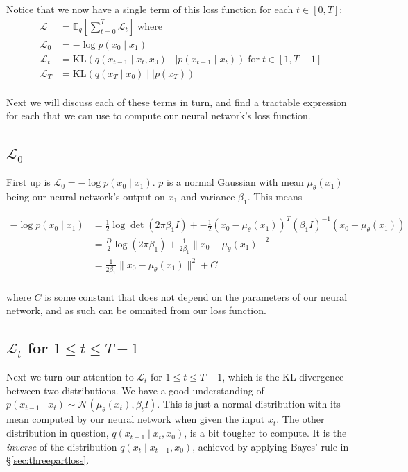 \documentclass[11pt,dvipsnames]{article}
\begin{document}
Notice that we now have a single term of this loss function for each $t \in [0, T]$:
\begin{equation*}
\begin{split}
\mathcal{L} &= \mathbb{E}_q \left[ \sum_{t=0}^T \mathcal{L}_t \right] \; \text{where} \\
\mathcal{L}_0 &= -\log p(x_0 \mid x_1) \\
\mathcal{L}_t &= \text{KL}(q(x_{t-1} \mid x_t, x_0) \mid\mid p(x_{t-1} \mid x_{t})) \; \text{for} \; t \in [1, T-1] \\
\mathcal{L}_T &= \text{KL}(q(x_T \mid x_0) \mid\mid p(x_T)) \\
\end{split}
\end{equation*}

Next we will discuss each of these terms in turn, and find a tractable expression for each that we can use to compute
our neural network's loss function.

\subsection{$\mathcal{L}_0$}
First up is $\mathcal{L}_0 = -\log p(x_0 \mid x_1)$.
$p$ is a normal Gaussian with mean $\mu_\theta(x_1)$ being our neural network's output on $x_1$ and variance $\beta_1$.
This means

\begin{equation*}
\begin{split}
-\log p(x_0 \mid x_1) &= \frac{1}{2} \log\det(2\pi\beta_1 I) +-\frac{1}{2}(x_0 - \mu_\theta(x_1))^T(\beta_1I)^{-1}(x_0 - \mu_\theta(x_1)) \\
&= \frac{D}{2} \log (2\pi\beta_1) + \frac{1}{2\beta_1} \lVert x_0 - \mu_\theta(x_1) \rVert^2 \\
&= \frac{1}{2\beta_1} \lVert x_0 - \mu_\theta(x_1) \rVert^2 + C \\
\end{split}
\end{equation*}

where $C$ is some constant that does not depend on the parameters of our neural network, and as such can be ommited from our loss function.

\subsection{$\mathcal{L}_t$ for $1 \leq t \leq T - 1$}
Next we turn our attention to $\mathcal{L}_t$ for $1 \le t \le T - 1$, which is the KL divergence between two distributions.
We have a good understanding of $p(x_{t-1} \mid x_t) \sim \mathcal{N}(\mu_\theta(x_t), \beta_tI)$.
This is just a normal distribution with its mean computed by our neural network when given the input $x_t$.
The other distribution in question, $q(x_{t-1} \mid x_t, x_0)$, is a bit tougher to compute. It is the \emph{inverse} of the
distribution $q(x_t \mid x_{t-1}, x_0)$, achieved by applying Bayes' rule in \S\ref{sec:threepartloss}.
\end{document}
